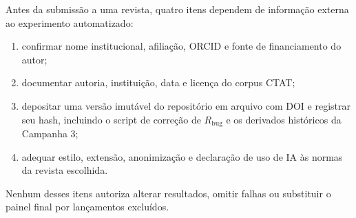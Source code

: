 \documentclass[11pt,a4paper]{article}
\begin{document}
Antes da submissão a uma revista, quatro itens dependem de informação externa ao experimento automatizado:

\begin{enumerate}
  \item confirmar nome institucional, afiliação, ORCID e fonte de financiamento do autor;
  \item documentar autoria, instituição, data e licença do corpus CTAT;
  \item depositar uma versão imutável do repositório em arquivo com DOI e registrar seu hash, incluindo o script de correção de $R_{\mathrm{bug}}$ e os derivados históricos da Campanha 3;
  \item adequar estilo, extensão, anonimização e declaração de uso de IA às normas da revista escolhida.
\end{enumerate}

Nenhum desses itens autoriza alterar resultados, omitir falhas ou substituir o painel final por lançamentos excluídos.
\end{document}
